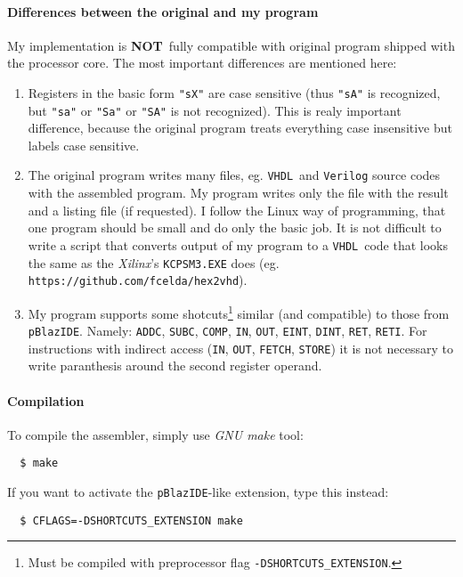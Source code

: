 \documentclass[10pt,a4paper]{article}
\def\Xilinx{\textit{Xilinx}}
\def\VHDL{\texttt{VHDL}}
\def\NOT{\textbf{NOT}}
\def\ins #1{\texttt{#1}}
\begin{document}
\paragraph{Differences between the original and my program}
My implementation is \NOT\ fully compatible with original program 
	shipped with the processor core. The most important differences are mentioned here:
\begin{enumerate}
	\item Registers in the basic form \texttt{"sX"} are case sensitive (thus \texttt{"sA"} is recognized, but \texttt{"sa"} 
		or \texttt{"Sa"} or \texttt{"SA"} is not recognized). This is realy important difference, because the original
		program treats everything case insensitive but labels case sensitive. 
	\item The original program writes many files, eg. \VHDL\ and \texttt{Verilog} source codes with
		the assembled program. My program writes only the file with the result and a listing file (if requested).
		I follow the Linux way of programming, that one program should be small and do only the basic job.
		It is not difficult to write a script that converts output of my program to a \VHDL\ code that looks 
		the same as the \Xilinx's \texttt{KCPSM3.EXE} does (eg. \texttt{https://github.com/fcelda/hex2vhd}).
	\item My program supports some shotcuts\footnote{Must be compiled with preprocessor flag \texttt{-DSHORTCUTS\_EXTENSION}.} 
		similar (and compatible) to those from \texttt{pBlazIDE}. Namely: \ins{ADDC}, \ins{SUBC}, \ins{COMP}, \ins{IN}, \ins{OUT}, 
	   \ins{EINT}, \ins{DINT}, \ins{RET}, \ins{RETI}. For instructions with indirect access (\ins{IN}, \ins{OUT}, \ins{FETCH}, 
		\ins{STORE}) it is not necessary	to write paranthesis around the second register operand.
\end{enumerate}

\paragraph{Compilation}
To compile the assembler, simply use \textit{GNU make} tool:
\begin{verbatim}
  $ make
\end{verbatim}

If you want to activate the \texttt{pBlazIDE}-like extension, type this instead:
\begin{verbatim}
  $ CFLAGS=-DSHORTCUTS_EXTENSION make
\end{verbatim}
\end{document}
